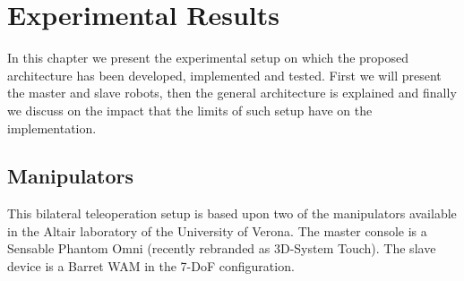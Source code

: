 \chapter{Experimental Results} \label{chap:experimental-results}
In this chapter we present the experimental setup on which the proposed architecture has been developed, implemented and tested.
First we will present the master and slave robots,  then the general architecture is explained and finally we discuss on the impact that the limits of such setup have on the implementation.

\section{Manipulators}
This bilateral teleoperation setup is based upon two of the manipulators available in the Altair laboratory of the University of Verona.
The master console is a Sensable Phantom Omni (recently rebranded as 3D-System Touch).
The slave device is a Barret WAM in the 7-DoF configuration.




\begin{table}[htbp]
	\caption{Performance Measurement: camera 10 Hz \label{tab:Performance-Measurement-10hz}}
\end{table}


